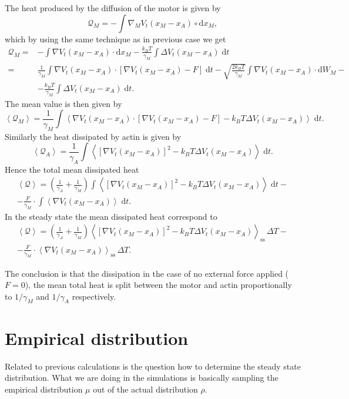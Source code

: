 \documentclass[11pt]{article}
\newcommand{\rmd}{{\mathrm d}}
\begin{document}
The heat produced by the diffusion of the motor is given by 
\[
{\mathcal Q}_M = - \int \nabla_M V_t(x_M - x_A) \circ \rmd x_M , 
\]
which by using the same technique as in previous case we get 
\begin{align*}
{\mathcal Q}_M 
=& - \int \nabla V_t(x_M - x_A) \cdot \rmd x_M - \frac{k_B T}{\gamma_M} \int \Delta V_t(x_M - x_A) \; \rmd t \\ 
=& \frac{1}{\gamma_M} \int \nabla V_t(x_M - x_A) \cdot \left[ \nabla V_t(x_M - x_A) - F \right] \; \rmd t - \sqrt{ \frac{ 2 k_B T }{\gamma_M} } \int \nabla V_t(x_M - x_A) \cdot \rmd W_M - \\
& - \frac{k_B T}{\gamma_M} \int \Delta V_t(x_M - x_A) \; \rmd t . 
\end{align*}
The mean value is then given by
\[
\left\langle {\mathcal Q}_M \right\rangle 
= \frac{1}{\gamma_M} \int \left\langle \nabla V_t(x_M - x_A) \cdot \left[ \nabla V_t(x_M - x_A) - F \right] - k_B T \Delta V_t(x_M - x_A) \right\rangle \; \rmd t . 
\]
Similarly the heat dissipated by actin is given by 
\[
\left\langle {\mathcal Q}_A \right\rangle 
= \frac{1}{\gamma_A} \int \left\langle \left[ \nabla V_t(x_M - x_A) \right]^2 - k_B T \Delta V_t(x_M - x_A) \right\rangle \; \rmd t . 
\]
Hence the total mean dissipated heat
\begin{multline*}
\left\langle {\mathcal Q} \right\rangle 
= \left( \frac{1}{\gamma_A} + \frac{1}{\gamma_M} \right) \int \left\langle \left[ \nabla V_t(x_M - x_A) \right]^2 - k_B T \Delta V_t(x_M - x_A) \right\rangle \; \rmd t - \\
- \frac{F}{\gamma_M} \cdot \int \left\langle \nabla V_t(x_M - x_A) \right\rangle \; \rmd t . 
\end{multline*}
In the steady state the mean dissipated heat correspond to 
\begin{multline*}
\left\langle {\mathcal Q} \right\rangle 
= \left( \frac{1}{\gamma_A} + \frac{1}{\gamma_M} \right) \left\langle \left[ \nabla V_t(x_M - x_A) \right]^2 - k_B T \Delta V_t(x_M - x_A) \right\rangle_\text{ss} \, \Delta T - \\
- \frac{F}{\gamma_M} \cdot \left\langle \nabla V_t(x_M - x_A) \right\rangle_\text{ss} \, \Delta T . 
\end{multline*}

The conclusion is that the dissipation in the case of no external force applied ($F=0$), the mean total heat is split between the motor and actin proportionally to $1/\gamma_M$ and $1/\gamma_A$ respectively. 


\section{Empirical distribution}
Related to previous calculations is the question how to determine the steady state distribution. 
What we are doing in the simulations is basically sampling the empirical distribution $\mu$ out of the actual distribution $\rho$. 
\end{document}
